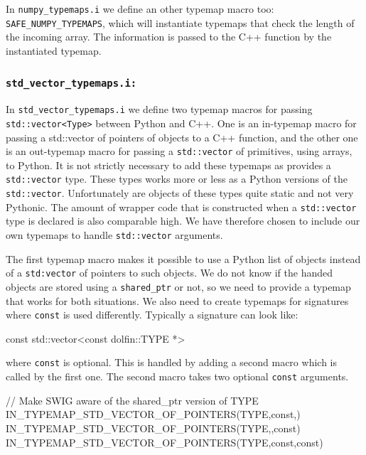 \begin{code}
In \texttt{numpy\_typemaps.i} we define an other typemap macro too: \texttt{SAFE\_}\-\texttt{NUMPY\_}\-\texttt{TYPEMAPS}, which will instantiate typemaps that check the length of the incoming \numpy array. The information is passed to the C++ function by the instantiated typemap.\par

\subsubsection{\texttt{std\_vector\_typemaps.i:}}
In \texttt{std\_vector\_typemaps.i} we define two typemap macros for passing \texttt{std::}\-\texttt{vector<Type>} between Python and C++. One is an in-typemap macro for passing a std::vector of pointers of \dolfin objects to a C++ function, and the other one is an out-typemap macro for passing a \texttt{std::vector} of primitives, using \numpy arrays, to Python. It is not strictly necessary to add these typemaps as \swig provides a \texttt{std::vector} type. These types works more or less as a Python versions of the \texttt{std::vector}. Unfortunately are objects of these types quite static and not very Pythonic. The amount of wrapper code that is constructed when a \texttt{std::vector} type is declared is also comparable high. We have therefore chosen to include our own typemaps to handle \texttt{std::vector} arguments.\par

The first typemap macro makes it possible to use a Python list of \dolfin objects instead of a \texttt{std:vector} of pointers to such objects. We do not know if the handed \dolfin objects are stored using a \texttt{shared\_ptr} or not, so we need to provide a typemap that works for both situations. We also need to create typemaps for signatures where \texttt{const} is used differently. Typically a signature can look like:
\begin{code}
{const} std::vector<{const} dolfin::TYPE *>
\end{code}
where \texttt{const} is optional. This is handled by adding a second macro which is called by the first one. The second macro takes two optional \texttt{const} arguments.
\begin{code}
// Make SWIG aware of the shared_ptr version of TYPE
IN_TYPEMAP_STD_VECTOR_OF_POINTERS(TYPE,const,)
IN_TYPEMAP_STD_VECTOR_OF_POINTERS(TYPE,,const)
IN_TYPEMAP_STD_VECTOR_OF_POINTERS(TYPE,const,const)


\end{code}
\end{code}
